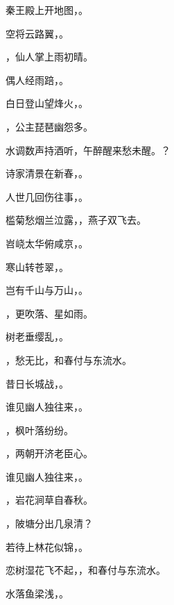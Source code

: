 \documentclass[12pt, a4paper, addpoints]{exam}
\begin{document}
\begin{questions}
\question[1] 秦王殿上开地图，\uline{\qquad\qquad\qquad}。

\question[1] 空将云路翼，\uline{\qquad\qquad\qquad}。

\question[1] \uline{\qquad\qquad\qquad}，仙人掌上雨初晴。

\question[1] 偶人经雨踣，\uline{\qquad\qquad\qquad}。

\question[1] 白日登山望烽火，\uline{\qquad\qquad\qquad}。

\question[1] \uline{\qquad\qquad\qquad}，公主琵琶幽怨多。

\question[1] 水调数声持酒听，午醉醒来愁未醒。\uline{\qquad\qquad\qquad}？

\question[1] 诗家清景在新春，\uline{\qquad\qquad\qquad}。

\question[1] 人世几回伤往事，\uline{\qquad\qquad\qquad}。

\question[1] 槛菊愁烟兰泣露，\uline{\qquad\qquad\qquad}，燕子双飞去。

\question[1] 岧峣太华俯咸京，\uline{\qquad\qquad\qquad}。

\question[1] 寒山转苍翠，\uline{\qquad\qquad\qquad}。

\question[1] 岂有千山与万山，\uline{\qquad\qquad\qquad}。

\question[1] \uline{\qquad\qquad\qquad}，更吹落、星如雨。

\question[1] 树老垂缨乱，\uline{\qquad\qquad\qquad}。

\question[1] \uline{\qquad\qquad\qquad}，愁无比，和春付与东流水。

\question[1] 昔日长城战，\uline{\qquad\qquad\qquad}。

\question[1] 谁见幽人独往来，\uline{\qquad\qquad\qquad}。

\question[1] \uline{\qquad\qquad\qquad}，枫叶落纷纷。

\question[1] \uline{\qquad\qquad\qquad}，两朝开济老臣心。

\question[1] 谁见幽人独往来，\uline{\qquad\qquad\qquad}。

\question[1] \uline{\qquad\qquad\qquad}，岩花涧草自春秋。

\question[1] \uline{\qquad\qquad\qquad}，陂塘分出几泉清？

\question[1] 若待上林花似锦，\uline{\qquad\qquad\qquad}。

\question[1] 恋树湿花飞不起，\uline{\qquad\qquad\qquad}，和春付与东流水。

\question[1] 水落鱼梁浅，\uline{\qquad\qquad\qquad}。


\end{questions}
\end{document}
